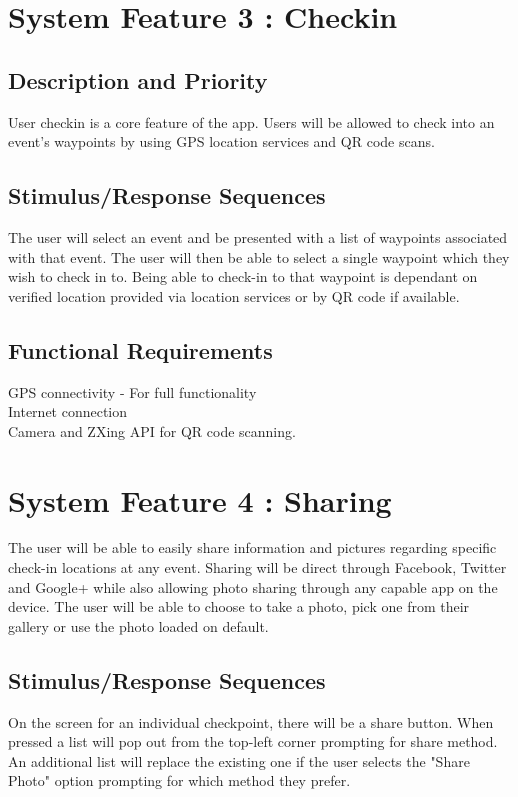 \documentclass{scrreprt}
\begin{document}
\section{System Feature 3 : Checkin}

\subsection{Description and Priority}
User checkin is a core feature of the app.
Users will be allowed to check into an event's waypoints by using GPS location services and QR code scans.

\subsection{Stimulus/Response Sequences}
The user will select an event and be presented with a list of waypoints associated with that event.
The user will then be able to select a single waypoint which they wish to check in to.
Being able to check-in to that waypoint is dependant on verified location provided via location services or by QR code
if available. \\

\subsection{Functional Requirements}
GPS connectivity - For full functionality\\
Internet connection \\
Camera and ZXing API for QR code scanning.

\section{System Feature 4 : Sharing}
The user will be able to easily share information and pictures regarding specific check-in locations at any event. Sharing will be  direct through Facebook, Twitter and Google+ while also allowing photo sharing through any capable app on the device. The user will be able to choose to take a photo, pick one from their gallery or use the photo loaded on default.

\subsection{Stimulus/Response Sequences}
On the screen for an individual checkpoint, there will be a share button. When pressed a list will pop out from the top-left corner prompting for share method. An additional list will replace the existing one if the user selects the "Share Photo" option prompting for which method they prefer.
\end{document}
